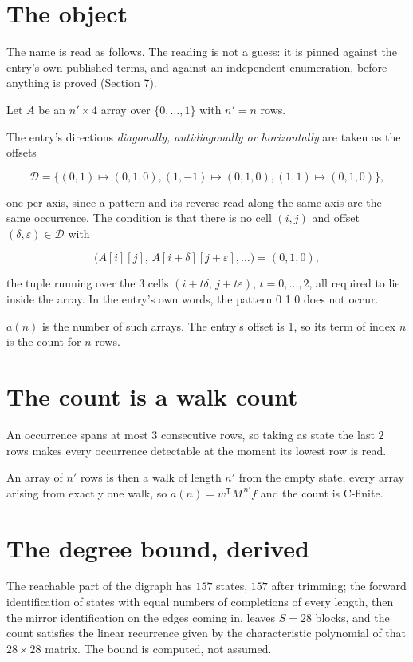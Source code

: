 \documentclass[11pt]{article}
\theoremstyle{definition}
\begin{document}
\section{The object}

The name is read as follows. The reading is not a guess: it is pinned against the entry's own published terms, and against an independent enumeration, before anything is proved (Section 7).

Let $A$ be an $n' \times 4$ array over $\{0,\dots,1\}$ with $n' = n$ rows.

The entry's directions {\itshape diagonally, antidiagonally or horizontally} are taken as the offsets

\[\mathcal{D} = \{(0,1)\mapsto(0,1,0), (1,-1)\mapsto(0,1,0), (1,1)\mapsto(0,1,0)\},\]

one per axis, since a pattern and its reverse read along the same axis are the same occurrence. The condition is that there is no cell $(i,j)$ and offset $(\delta,\varepsilon)\in\mathcal{D}$ with

\[\bigl(A[i][j],\,A[i{+}\delta][j{+}\varepsilon],\dots\bigr) = (0, 1, 0),\]

the tuple running over the $3$ cells $(i+t\delta,\,j+t\varepsilon)$, $t = 0,\dots,2$, all required to lie inside the array. In the entry's own words, the pattern 0 1 0 does not occur.

$a(n)$ is the number of such arrays. The entry's offset is 1, so its term of index $n$ is the count for $n$ rows.

\section{The count is a walk count}

An occurrence spans at most $3$ consecutive rows, so taking as state the last $2$ rows makes every occurrence detectable at the moment its lowest row is read.

An array of $n'$ rows is then a walk of length $n'$ from the empty state, every array arising from exactly one walk, so $a(n) = w^{\mathsf T}M^{\,n'}f$ and the count is C-finite.

\section{The degree bound, derived}

The reachable part of the digraph has $157$ states, $157$ after trimming; the forward identification of states with equal numbers of completions of every length, then the mirror identification on the edges coming in, leaves $S = 28$ blocks, and the count satisfies the linear recurrence given by the characteristic polynomial of that $28\times28$ matrix. The bound is computed, not assumed.
\end{document}
